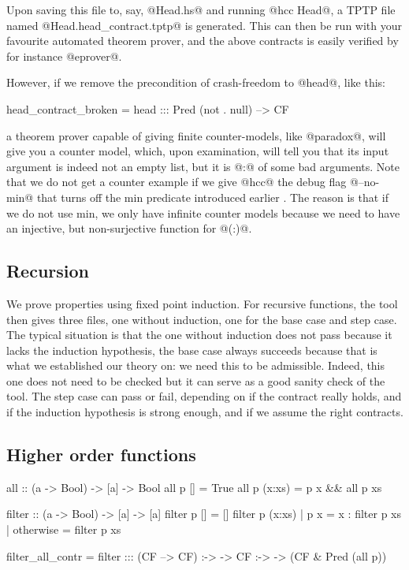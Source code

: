 Upon saving this file to, say, @Head.hs@ and running @hcc Head@, a
TPTP file named @Head.head_contract.tptp@ is generated. This can then
be run with your favourite automated theorem prover, and the above
contracts is easily verified by for instance @eprover@.

However, if we remove the precondition of crash-freedom to @head@,
like this:

\begin{code}
head_contract_broken =
    head ::: Pred (not . null) --> CF
\end{code}

a theorem prover capable of giving finite counter-models, like
@paradox@, will give you a counter model, which, upon examination,
will tell you that its input argument is indeed not an empty list, but
it is @:@ of some bad arguments. Note that we do not get a counter
example if we give @hcc@ the debug flag @--no-min@ that turns off the
min predicate introduced earlier . The reason is that if we
do not use min, we only have infinite counter models because we need
to have an injective, but non-surjective function for @(:)@.

\subsection{Recursion}

We prove properties using fixed point induction. For recursive
functions, the tool then gives three files, one without induction, one
for the base case and step case. The typical situation is that the one
without induction does not pass because it lacks the induction
hypothesis, the base case always succeeds because that is what we
established our theory on: we need this to be admissible. Indeed, this
one does not need to be checked but it can serve as a good sanity
check of the tool. The step case can pass or fail, depending on if the
contract really holds, and if the induction hypothesis is strong
enough, and if we assume the right contracts.

\subsection{Higher order functions}

\begin{code}
all :: (a -> Bool) -> [a] -> Bool
all p []     = True
all p (x:xs) = p x && all p xs

filter :: (a -> Bool) -> [a] -> [a]
filter p [] = []
filter p (x:xs) | p x       = x : filter p xs
                | otherwise = filter p xs

filter_all_contr =
    filter ::: (CF --> CF) :-> \p ->
               CF :-> \xs ->
               (CF & Pred (all p))
\end{code}

